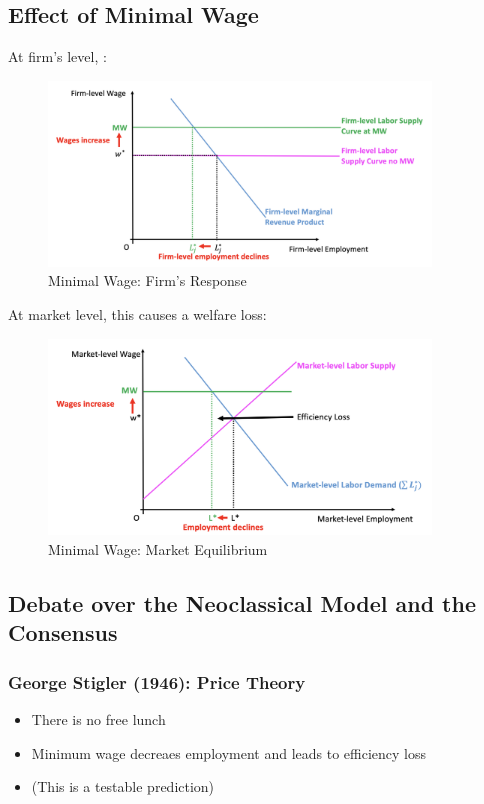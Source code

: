     \subsection{Effect of Minimal Wage}
        At firm's level, :
        \begin{figure}[H]
            \centering
            \includegraphics[width=4in]{images/ch2/neoclassical_3.png}
            \caption{Minimal Wage: Firm's Response}
        \end{figure}
        At market level, this causes a welfare loss:
        \begin{figure}[H]
            \centering
            \includegraphics[width=4in]{images/ch2/neoclassical_4.png}
            \caption{Minimal Wage: Market Equilibrium}
        \end{figure}
    
    \subsection{Debate over the Neoclassical Model and the Consensus}
    
        \subsubsection{George Stigler (1946): Price Theory}
            \begin{itemize}
                \item There is no free lunch
                \item Minimum wage decreaes employment and leads to efficiency loss
                \item (This is a testable prediction)
            \end{itemize}
            
